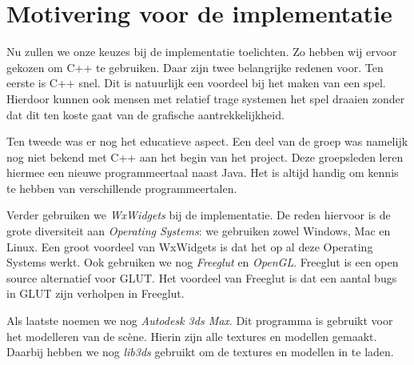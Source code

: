 \section{Motivering voor de implementatie}
Nu zullen we onze keuzes bij de implementatie toelichten. Zo hebben wij ervoor gekozen om C++ te gebruiken. Daar zijn twee belangrijke redenen voor. Ten eerste is C++ snel. Dit is natuurlijk een voordeel bij het maken van een spel. Hierdoor kunnen ook mensen met relatief trage systemen het spel draaien zonder dat dit ten koste gaat van de grafische aantrekkelijkheid.

Ten tweede was er nog het educatieve aspect. Een deel van de groep was namelijk nog niet bekend met C++ aan het begin van het project. Deze groepsleden leren hiermee een nieuwe programmeertaal naast Java. Het is altijd handig om kennis te hebben van verschillende programmeertalen.

Verder gebruiken we \emph{WxWidgets} bij de implementatie. De reden hiervoor is de grote diversiteit aan \emph{Operating Systems}: we gebruiken zowel Windows, Mac en Linux. Een groot voordeel van WxWidgets is dat het op al deze Operating Systems werkt. Ook gebruiken we nog \emph{Freeglut} en \emph{OpenGL}. Freeglut is een open source alternatief voor GLUT. Het voordeel van Freeglut is dat een aantal bugs in GLUT zijn verholpen in Freeglut.

Als laatste noemen we nog \emph{Autodesk 3ds Max}. Dit programma is gebruikt voor het modelleren van de sc\`ene. Hierin zijn alle textures en modellen gemaakt. Daarbij hebben we nog \emph{lib3ds} gebruikt om de textures en modellen in te laden. 
